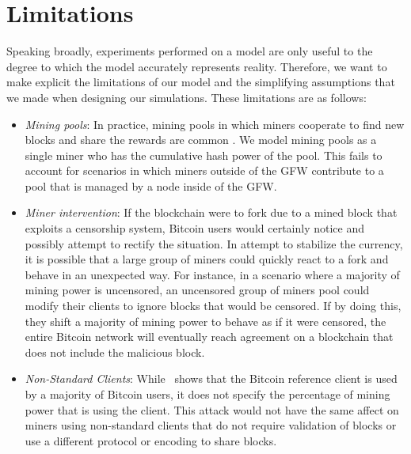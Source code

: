 \section{Limitations}
Speaking broadly, experiments performed on a model are only useful to the degree to which the model accurately represents reality.
Therefore, we want to make explicit the limitations of our model and the simplifying assumptions that we made when designing our simulations. These limitations are as follows:

\begin{itemize}
	\item \textit{Mining pools}: In practice, mining pools in which miners cooperate to find new blocks and share the rewards are common \cite{Rosenfeld}. We model mining pools as a single miner who has the cumulative hash power of the pool. This fails to account for scenarios in which miners outside of the GFW contribute to a pool that is managed by a node inside of the GFW.
	\item \textit{Miner intervention}: If the blockchain were to fork due to a mined block that exploits a censorship system, Bitcoin users would certainly notice and possibly attempt to rectify the situation.
In attempt to stabilize the currency, it is possible that a large group of miners could quickly react to a fork and behave in an unexpected way. For instance, in a scenario where a majority of mining power is uncensored, an uncensored group of miners pool could modify their clients to ignore blocks that would be censored. If by doing this, they shift a majority of mining power to behave as if it were censored, the entire Bitcoin network will eventually reach agreement on a blockchain that does not include the malicious block.
	\item \textit{Non-Standard Clients}: While~\cite{shadow-bitcoin} shows that the Bitcoin reference client is used by a majority of Bitcoin users, it does not specify the percentage of mining power that is using the client. This attack would not have the same affect on miners using non-standard clients that do not require validation of blocks or use a different protocol or encoding to share blocks.
\end{itemize}



